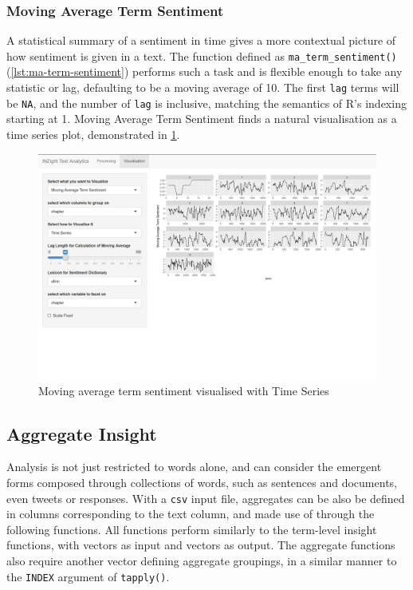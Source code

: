 \documentclass[11pt, a4paper, titlepage]{report}
\begin{document}
\subsubsection{Moving Average Term
  Sentiment}\label{sec:moving-average-term}

A statistical summary of a sentiment in time gives a more contextual
picture of how sentiment is given in a text. The function defined as
\texttt{ma_term_sentiment()}
(\underline{\cref{lst:ma-term-sentiment}}) performs such a task and is
flexible enough to take any statistic or lag, defaulting to be a
moving average of 10. The first \texttt{lag} terms will be
\texttt{NA}, and the number of \texttt{lag} is
inclusive, matching the semantics of R's indexing starting at 1.
Moving Average Term Sentiment finds a natural visualisation as a time
series plot, demonstrated in
\underline{\cref{fig:visualisation-ma-overview}}.

\begin{figure}
  \centering
  \includegraphics[scale=0.35]{visualisation-ma-overview.png}
  \caption{Moving average term sentiment visualised with Time
    Series\label{fig:visualisation-ma-overview}}
\end{figure}

\subsection{Aggregate Insight}\label{sec:aggregate-insight}

Analysis is not just restricted to words alone, and can consider the
emergent forms composed through collections of words, such as
sentences and documents, even tweets or responses. With a \texttt{csv}
input file, aggregates can be also be defined in columns corresponding
to the text column, and made use of through the following functions.
All functions perform similarly to the term-level insight functions,
with vectors as input and vectors as output. The aggregate functions
also require another vector defining aggregate groupings, in a similar
manner to the \texttt{INDEX} argument of
\texttt{tapply()}.
\end{document}
